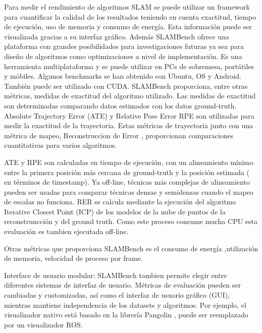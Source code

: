 \begin {enumerate}
Para medir el rendimiento de algoritmos SLAM se puede utilizar un framework para cuantificar la calidad de los resultados teniendo en cuenta exactitud, tiempo de ejecución, uso de memoria y consumo de energía. Esta información puede ser visualizada gracias a su interfaz gráfico.
Además SLAMBench ofrece una plataforma con grandes posibilidades para investigaciones futuras ya sea para diseño de algoritmos como optimizaciones a nivel de implementación. Es una herramienta multiplataforma y se puede utilizar en PCs de sobremesa, portátiles y móbiles. Algunos benchmarks se han obtenido con Ubuntu, OS y Android.
También puede ser utilizado con CUDA.
SLAMBench proporciona, entre otras métricas, medidas de exactitud del algoritmo utilizado. Las medidas de exactitud son determinadas comparando datos estimados con los datos ground-truth.
Absolute Trajectory Error (ATE) y Relative Pose Error RPE son utilizadas para medir la exactitud de la trayectoria. Estas métricas de trayectoria junto con una métrica de mapeo, Reconstruccion de Error , proporcionan comparaciones cuantitativas para varios algoritmos.

ATE y RPE son calculadas en tiempo de ejecución, con un alineamiento mínimo entre la primera posición más cercana de ground-truth y la posición estimada ( en términos de timestamp). Ya off-line, técnicas más complejas de alineamiento pueden ser usadas para comparar técnicas densas y semidensas cuando el mapeo de escalas no funciona. RER se calcula mediante la ejecución del algoritmo Iterative Closest Point (ICP) de los modelos de la nube de puntos de la reconstruncción y del ground truth. Como este proceso consume mucha CPU esta evaluación es tambien ejecutada off-line.

Otras métricas que proporciona SLAMBench es el consumo de energía ,utilización de memoria, velocidad de proceso por frame.

Interface de usuario modular: SLAMBench tambien permite elegir entre diferentes sistemas de interfaz de usuario. Métricas de evaluación pueden ser cambiadas y customizadas, así como el interfaz de usuario gráfico (GUI), mientras mantiene independencia de los datasets y algoritmos. Por ejemplo, el visualizador nativo está basado en la librería Pangolin , puede ser reemplazado por un visualizador ROS.


\end{enumerate}
